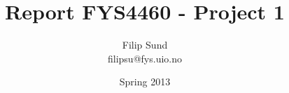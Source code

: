 \documentclass[a4paper,10pt]{article}
\title{Report FYS4460 - Project 1}
\author{Filip Sund \\ filipsu@fys.uio.no}
\date{Spring 2013}
\begin{document}
\maketitle{}


% 
%
\end{document}
